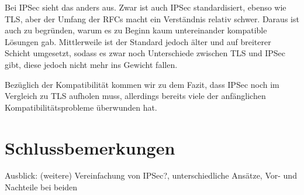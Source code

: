 \documentclass[12pt]{scrartcl}
\begin{document}
Bei IPSec sieht das anders aus. Zwar ist auch IPSec standardisiert, ebenso wie TLS, aber der Umfang der RFCs macht ein Verständnis relativ schwer. Daraus ist auch zu begründen, warum es zu Beginn kaum untereinander kompatible Lösungen gab\cite{Alshamsi2005}. Mittlerweile ist der Standard jedoch älter und auf breiterer Schicht umgesetzt, sodass es zwar noch Unterschiede zwischen TLS und IPSec gibt, diese jedoch nicht mehr ins Gewicht fallen.

Bezüglich der Kompatibilität kommen wir zu dem Fazit, dass IPSec noch im Vergleich zu TLS aufholen muss, allerdings bereits viele der anfänglichen Kompatibilitätsprobleme überwunden hat.

\section{Schlussbemerkungen}
Ausblick: (weitere) Vereinfachung von IPSec?, unterschiedliche Ansätze, Vor- und Nachteile bei beiden

\newpage

\printbibliography
{}


\newpage
{}
\end{document}
